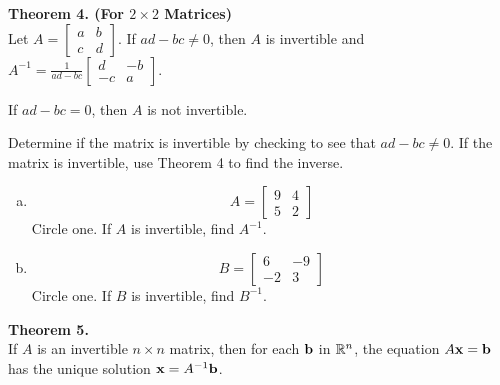 \begin{boxthm}
	\textbf{Theorem 4. (For $2\times 2$ Matrices)} \\
	Let $A=\begin{bmatrix}a&b\\c&d\end{bmatrix}$. If $ad-bc\neq 0$, then $A$ is invertible and
	$ A^{-1} = \frac{1}{ad-bc}\begin{bmatrix}d&-b\\-c&a\end{bmatrix}.$ \par
	If $ad-bc=0$, then $A$ is not invertible.
\end{boxthm}

\begin{exercise} %
	Determine if the matrix is invertible by checking to see that $ad-bc\neq 0$. If the matrix is invertible, use Theorem 4 to find the inverse.
	\begin{multicols}{2}
		\begin{enumerate}[(a)]
			\item $$A=\begin{bmatrix}9&4\\5&2\end{bmatrix}$$
			Circle one. If $A$ is invertible, find $A^{-1}$.
			\begin{center}
				 \hspace{5em}
			\end{center}
			
			\item $$B=\begin{bmatrix}6&-9\\-2&3\end{bmatrix}$$
			Circle one. If $B$ is invertible, find $B^{-1}$.
			\begin{center}
				 \hspace{5em}
			\end{center}
		\end{enumerate}
	\end{multicols}
\end{exercise}
\vfill


\begin{boxthm}
	\textbf{Theorem 5.} \\
	If $A$ is an invertible $n\times n$ matrix, then for each $\boldsymbol{\mathbf{b}}$ in $\mathbb{R}^n$, the equation $A\boldsymbol{\mathbf{x}}=\boldsymbol{\mathbf{b}}$ has the unique solution $\boldsymbol{\mathbf{x}}=A^{-1}\boldsymbol{\mathbf{b}}$.
\end{boxthm}

